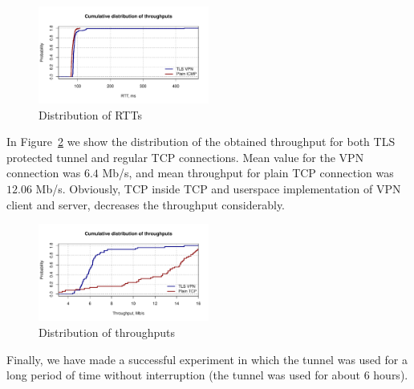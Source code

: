 \begin{figure}[!h]
        \includegraphics[width=0.5\textwidth]{graphics/rtt.pdf}
        \caption{Distribution of RTTs}
        \label{fig:rtt}
\end{figure}

In Figure~\ref{fig:iperf_distr} we show the distribution of the obtained throughput for both
TLS protected tunnel and regular TCP connections. Mean value for the VPN connection was 
$6.4$ Mb/s, and mean throughput for plain TCP connection was $12.06$ Mb/s. Obviously, 
TCP inside TCP and userspace implementation of VPN client and server, decreases the 
throughput considerably.

\begin{figure}[!h]
        \includegraphics[width=0.5\textwidth]{graphics/throughput.pdf}
        \caption{Distribution of throughputs}
        \label{fig:iperf_distr}
\end{figure}

Finally, we have made a successful experiment in which the tunnel was used for a long period of time
without interruption (the tunnel was used for about 6 hours).
